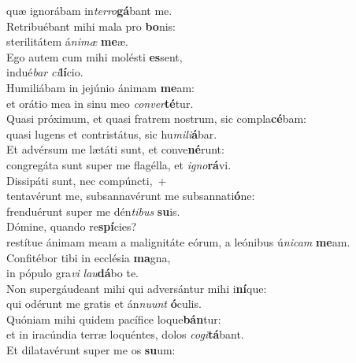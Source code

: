 \oddverse quæ ignorábam in\textit{ter}\textit{ro}\textbf{gá}bant me.\\
\evenverse Retribuébant mihi mala pro \textbf{bo}nis:~\*\\
\evenverse sterilitátem á\textit{ni}\textit{mæ} \textbf{me}æ.\\
\oddverse Ego autem cum mihi molésti \textbf{es}sent,~\*\\
\oddverse indué\textit{bar} \textit{ci}\textbf{lí}cio.\\
\evenverse Humiliábam in jejúnio ánimam \textbf{me}am:~\*\\
\evenverse et orátio mea in sinu meo \textit{con}\textit{ver}\textbf{té}tur.\\
\oddverse Quasi próximum, et quasi fratrem nostrum, sic compla\textbf{cé}bam:~\*\\
\oddverse quasi lugens et contristátus, sic hu\textit{mi}\textit{li}\textbf{á}bar.\\
\evenverse Et advérsum me lætáti sunt, et conve\textbf{né}runt:~\*\\
\evenverse congregáta sunt super me flagélla, et \textit{i}\textit{gno}\textbf{rá}vi.\\
\oddverse Dissipáti sunt, nec compúncti,~+\\
\oddverse  tentavérunt me, subsannavérunt me subsannati\textbf{ó}ne:~\*\\
\oddverse frenduérunt super me dén\textit{ti}\textit{bus} \textbf{su}is.\\
\evenverse Dómine, quando re\textbf{spí}cies?~\*\\
\evenverse restítue ánimam meam a malignitáte eórum, a leónibus ú\textit{ni}\textit{cam} \textbf{me}am.\\
\oddverse Confitébor tibi in ecclésia \textbf{ma}gna,~\*\\
\oddverse in pópulo gra\textit{vi} \textit{lau}\textbf{dá}bo te.\\
\evenverse Non supergáudeant mihi qui adversántur mihi i\textbf{ní}que:~\*\\
\evenverse qui odérunt me gratis et án\textit{nu}\textit{unt} \textbf{ó}culis.\\
\oddverse Quóniam mihi quidem pacífice loque\textbf{bán}tur:~\*\\
\oddverse et in iracúndia terræ loquéntes, dolos \textit{co}\textit{gi}\textbf{tá}bant.\\
\evenverse Et dilatavérunt super me os \textbf{su}um:~\*\\

